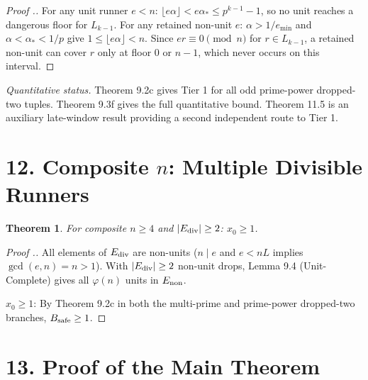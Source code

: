 \documentclass[11pt,a4paper]{article}
\theoremstyle{plain}
\newtheorem{theorem}{Theorem}[section]
\theoremstyle{definition}
\theoremstyle{remark}
\begin{document}
\begin{proof}[Proof .]
For any unit runner $e < n$: $\lfloor e\alpha \rfloor < e\alpha_* \leq p^{k-1}-1$, so no unit reaches a dangerous floor for $L_{k-1}$. For any retained non-unit $e$: $\alpha > 1/e_{\min}$ and $\alpha < \alpha_* < 1/p$ give $1 \leq \lfloor e\alpha \rfloor < n$. Since $er \equiv 0 \pmod n$ for $r \in L_{k-1}$, a retained non-unit can cover $r$ only at floor 0 or $n-1$, which never occurs on this interval.
\end{proof}

\textit{Quantitative status.} Theorem 9.2c gives Tier 1 for all odd prime-power dropped-two tuples. Theorem 9.3f gives the full quantitative bound. Theorem 11.5 is an auxiliary late-window result providing a second independent route to Tier 1.


\medskip



\section{12. Composite $n$: Multiple Divisible Runners}



\begin{theorem}
For composite $n \geq 4$ and $|E_{\rm div}| \geq 2$: $x_0 \geq 1$.

\end{theorem}

\begin{proof}[Proof .]
All elements of $E_{\rm div}$ are non-units ($n \mid e$ and $e < nL$ implies $\gcd(e,n) = n > 1$). With $|E_{\rm div}| \geq 2$ non-unit drops, Lemma 9.4 (Unit-Complete) gives all $\varphi(n)$ units in $E_{\rm non}$.

$x_0 \geq 1$: By Theorem 9.2c in both the multi-prime and prime-power dropped-two branches, $B_{\rm safe} \geq 1$.
\end{proof}


\medskip



\section{13. Proof of the Main Theorem}
\end{document}
